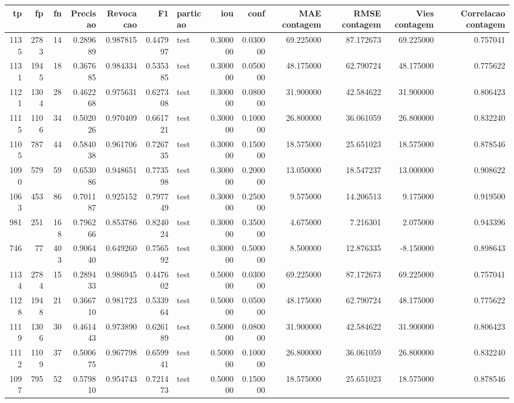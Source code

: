 \begin{tabular}{rrrrrrlrrrrrr}
\toprule
tp & fp & fn & Precisao & Revocacao & F1 & particao & iou & conf & MAE contagem & RMSE contagem & Vies contagem & Correlacao contagem \\
\midrule
1135 & 2783 & 14 & 0.289689 & 0.987815 & 0.447997 & test & 0.300000 & 0.030000 & 69.225000 & 87.172673 & 69.225000 & 0.757041 \\
1131 & 1945 & 18 & 0.367685 & 0.984334 & 0.535385 & test & 0.300000 & 0.050000 & 48.175000 & 62.790724 & 48.175000 & 0.775622 \\
1121 & 1304 & 28 & 0.462268 & 0.975631 & 0.627308 & test & 0.300000 & 0.080000 & 31.900000 & 42.584622 & 31.900000 & 0.806423 \\
1115 & 1106 & 34 & 0.502026 & 0.970409 & 0.661721 & test & 0.300000 & 0.100000 & 26.800000 & 36.061059 & 26.800000 & 0.832240 \\
1105 & 787 & 44 & 0.584038 & 0.961706 & 0.726735 & test & 0.300000 & 0.150000 & 18.575000 & 25.651023 & 18.575000 & 0.878546 \\
1090 & 579 & 59 & 0.653086 & 0.948651 & 0.773598 & test & 0.300000 & 0.200000 & 13.050000 & 18.547237 & 13.000000 & 0.908622 \\
1063 & 453 & 86 & 0.701187 & 0.925152 & 0.797749 & test & 0.300000 & 0.250000 & 9.575000 & 14.206513 & 9.175000 & 0.919500 \\
981 & 251 & 168 & 0.796266 & 0.853786 & 0.824024 & test & 0.300000 & 0.350000 & 4.675000 & 7.216301 & 2.075000 & 0.943396 \\
746 & 77 & 403 & 0.906440 & 0.649260 & 0.756592 & test & 0.300000 & 0.500000 & 8.500000 & 12.876335 & -8.150000 & 0.898643 \\
1134 & 2784 & 15 & 0.289433 & 0.986945 & 0.447602 & test & 0.500000 & 0.030000 & 69.225000 & 87.172673 & 69.225000 & 0.757041 \\
1128 & 1948 & 21 & 0.366710 & 0.981723 & 0.533964 & test & 0.500000 & 0.050000 & 48.175000 & 62.790724 & 48.175000 & 0.775622 \\
1119 & 1306 & 30 & 0.461443 & 0.973890 & 0.626189 & test & 0.500000 & 0.080000 & 31.900000 & 42.584622 & 31.900000 & 0.806423 \\
1112 & 1109 & 37 & 0.500675 & 0.967798 & 0.659941 & test & 0.500000 & 0.100000 & 26.800000 & 36.061059 & 26.800000 & 0.832240 \\
1097 & 795 & 52 & 0.579810 & 0.954743 & 0.721473 & test & 0.500000 & 0.150000 & 18.575000 & 25.651023 & 18.575000 & 0.878546 \\

\end{tabular}

